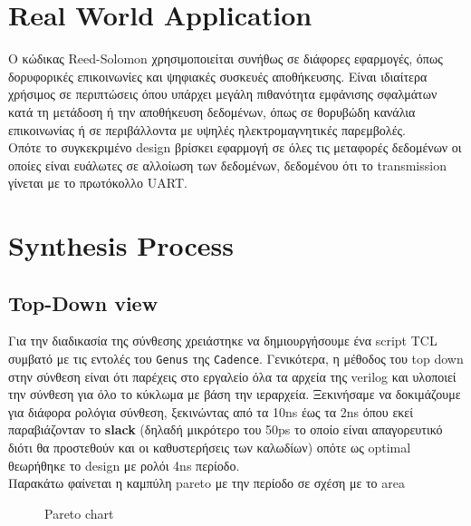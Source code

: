 \documentclass[12pt,a4paper]{article}
\begin{document}
     \section{\textcolor{PineGreen}{Real World Application}}
     Ο κώδικας Reed-Solomon χρησιμοποιείται συνήθως σε διάφορες εφαρμογές, όπως δορυφορικές επικοινωνίες και ψηφιακές συσκευές αποθήκευσης. Είναι ιδιαίτερα χρήσιμος σε περιπτώσεις όπου υπάρχει μεγάλη πιθανότητα εμφάνισης σφαλμάτων κατά τη μετάδοση ή την αποθήκευση δεδομένων, όπως σε θορυβώδη κανάλια επικοινωνίας ή σε περιβάλλοντα με υψηλές ηλεκτρομαγνητικές παρεμβολές.\\
     Οπότε το συγκεκριμένο design βρίσκει εφαρμογή σε όλες τις μεταφορές δεδομένων οι οποίες είναι ευάλωτες σε αλλοίωση των δεδομένων, δεδομένου ότι το transmission γίνεται με το πρωτόκολλο UART.

    \section{\textcolor{PineGreen}{Synthesis Process}}
    \subsection{\textcolor{PineGreen}{Top-Down view}}
    Για την διαδικασία της σύνθεσης χρειάστηκε να δημιουργήσουμε ένα script TCL συμβατό με τις εντολές του \verb|Genus| της \verb|Cadence|. Γενικότερα, η μέθοδος του top down στην σύνθεση είναι ότι παρέχεις στο εργαλείο όλα τα αρχεία της verilog και υλοποιεί την σύνθεση για όλο το κύκλωμα με βάση την ιεραρχεία.\newline
    Ξεκινήσαμε να δοκιμάζουμε για διάφορα ρολόγια σύνθεση, ξεκινώντας από τα 10ns έως τα 2ns όπου εκεί παραβιάζονταν το \textbf{slack} (δηλαδή μικρότερο του 50ps το οποίο είναι απαγορευτικό διότι θα προστεθούν και οι καθυστερήσεις των καλωδίων) οπότε ως optimal θεωρήθηκε το design με ρολόι 4ns περίοδο.\\
    Παρακάτω φαίνεται η καμπύλη pareto με την περίοδο σε σχέση με το area
    
   \begin{figure} [H]
    	\caption{Pareto chart}
    	\label{pareto chart}
    \end{figure}
\end{document}
